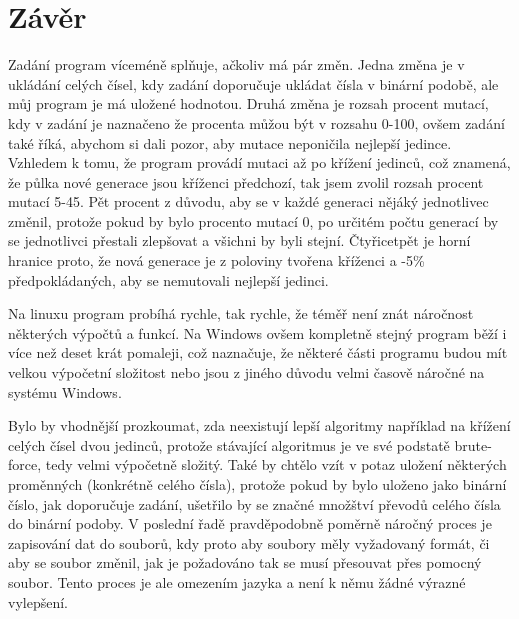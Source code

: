 \documentclass[11pt, a4paper]{article}
\begin{document}
\section{Závěr}
Zadání program víceméně splňuje, ačkoliv má pár změn. Jedna změna je v ukládání celých čísel, kdy zadání doporučuje ukládat čísla v binární podobě, ale můj program je má uložené hodnotou. Druhá změna je rozsah procent mutací, kdy v zadání je naznačeno že procenta můžou být v rozsahu 0-100, ovšem zadání také říká, abychom si dali pozor, aby mutace neponičila nejlepší jedince. Vzhledem k tomu, že program provádí mutaci až po křížení jedinců, což znamená, že půlka nové generace jsou kříženci předchozí, tak jsem zvolil rozsah procent mutací 5-45. Pět procent z důvodu, aby se v každé generaci nějáký jednotlivec změnil, protože pokud by bylo procento mutací 0, po určitém počtu generací by se jednotlivci přestali zlepšovat a všichni by byli stejní. Čtyřicetpět je horní hranice proto, že nová generace je z poloviny tvořena kříženci a -5\% předpokládaných, aby se nemutovali nejlepší jedinci.\par
Na linuxu program probíhá rychle, tak rychle, že téměř není znát náročnost některých výpočtů a funkcí. Na Windows ovšem kompletně stejný program běží i více než deset krát pomaleji, což naznačuje, že některé části programu budou mít velkou výpočetní složitost nebo jsou z jiného důvodu velmi časově náročné na systému Windows.\par
Bylo by vhodnější prozkoumat, zda neexistují lepší algoritmy například na křížení celých čísel dvou jedinců, protože stávající algoritmus je ve své podstatě brute-force, tedy velmi výpočetně složitý. Také by chtělo vzít v potaz uložení některých proměnných (konkrétně celého čísla), protože pokud by bylo uloženo jako binární číslo, jak doporučuje zadání, ušetřilo by se značné množštví převodů celého čísla do binární podoby. V poslední řadě pravděpodobně poměrně náročný proces je zapisování dat do souborů, kdy proto aby soubory měly vyžadovaný formát, či aby se soubor změnil, jak je požadováno tak se musí přesouvat přes pomocný soubor. Tento proces je ale omezením jazyka a není k němu žádné výrazné vylepšení.\par
\end{document}

